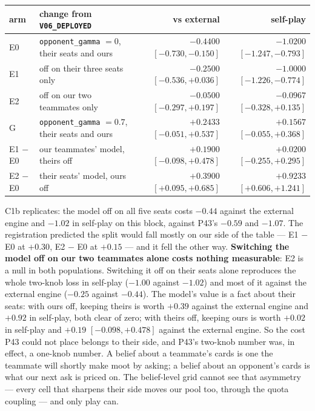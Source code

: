 \documentclass[11pt,letterpaper]{article}
\begin{document}
\begin{center}
\small
\begin{tabular}{l>{\raggedright\arraybackslash}p{4.4cm}rr}
\toprule
arm & change from \texttt{V06\_DEPLOYED} & vs external & self-play \\
\midrule
E0 & \texttt{opponent\_gamma} $=0$, their seats and ours & $-0.4400$ $[-0.730, -0.150]$ & $-1.0200$ $[-1.247, -0.793]$ \\
E1 & off on their three seats only & $\mathbf{-0.2500}$ $[-0.536, +0.036]$ & $-1.0000$ $[-1.226, -0.774]$ \\
E2 & off on our two teammates only & $\mathbf{-0.0500}$ $[-0.297, +0.197]$ & $\mathbf{-0.0967}$ $[-0.328, +0.135]$ \\
G & \texttt{opponent\_gamma} $=0.7$, their seats and ours & $\mathbf{+0.2433}$ $[-0.051, +0.537]$ & $\mathbf{+0.1567}$ $[-0.055, +0.368]$ \\
\midrule
E1 $-$ E0 & our teammates' model, theirs off & $+0.1900$ $[-0.098, +0.478]$ & $+0.0200$ $[-0.255, +0.295]$ \\
E2 $-$ E0 & their seats' model, ours off & $\mathbf{+0.3900}$ $[+0.095, +0.685]$ & $\mathbf{+0.9233}$ $[+0.606, +1.241]$ \\
\bottomrule
\end{tabular}
\end{center}

\noindent C1b replicates: the model off on all five seats costs $-0.44$
against the external engine and $-1.02$ in self-play on this block, against P43's $-0.59$
and $-1.07$. The registration predicted the split would fall mostly on our
side of the table --- E1 $-$ E0 at $+0.30$, E2 $-$ E0 at $+0.15$ --- and it
fell the other way. \textbf{Switching the model off on our two teammates alone
costs nothing measurable}: E2 is a null in both populations. Switching it off
on their seats alone reproduces the whole two-knob loss in self-play
($-1.00$ against $-1.02$) and most of it against the external engine ($-0.25$ against
$-0.44$). The model's value is a fact about their seats: with ours off,
keeping theirs is worth $+0.39$ against the external engine and $+0.92$ in self-play,
both clear of zero; with theirs off, keeping ours is worth $+0.02$ in
self-play and $+0.19$ $[-0.098, +0.478]$ against the external engine. So the cost P43
could not place belongs to their side, and P43's two-knob number was, in
effect, a one-knob number. A belief about a teammate's cards is one the
teammate will shortly make moot by asking; a belief about an opponent's cards
is what our next ask is priced on. The belief-level grid cannot see that
asymmetry --- every cell that sharpens their side moves our pool too, through
the quota coupling --- and only play can.
\end{document}
